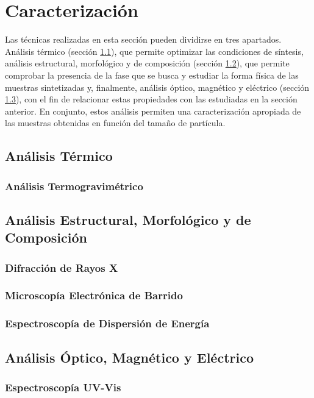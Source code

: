 \documentclass[../main.tex]{subfiles}
\begin{document}
\section{Caracterización}
Las técnicas realizadas en esta sección pueden dividirse en tres apartados. Análisis térmico (sección \ref{sec:analisistermico}), que permite optimizar las condiciones de síntesis, análisis estructural, morfológico y de composición (sección \ref{sec:analisisestruc}), que permite comprobar la presencia de la fase que se busca y estudiar la forma física de las muestras sintetizadas y, finalmente, análisis óptico, magnético y eléctrico (sección \ref{sec:analisisoptmagelec}), con el fin de relacionar estas propiedades con las estudiadas en la sección anterior. En conjunto, estos análisis permiten una caracterización apropiada de las muestras obtenidas en función del tamaño de partícula.
\subsection{Análisis Térmico} \label{sec:analisistermico}
\subsubsection{Análisis Termogravimétrico} \label{sec:TGA}

\subsection{Análisis Estructural, Morfológico y de Composición} \label{sec:analisisestruc}
\subsubsection{Difracción de Rayos X}

\subsubsection{Microscopía Electrónica de Barrido}

\subsubsection{Espectroscopía de Dispersión de Energía}

\subsection{Análisis Óptico, Magnético y Eléctrico} \label{sec:analisisoptmagelec}
\subsubsection{Espectroscopía UV-Vis}
\end{document}
